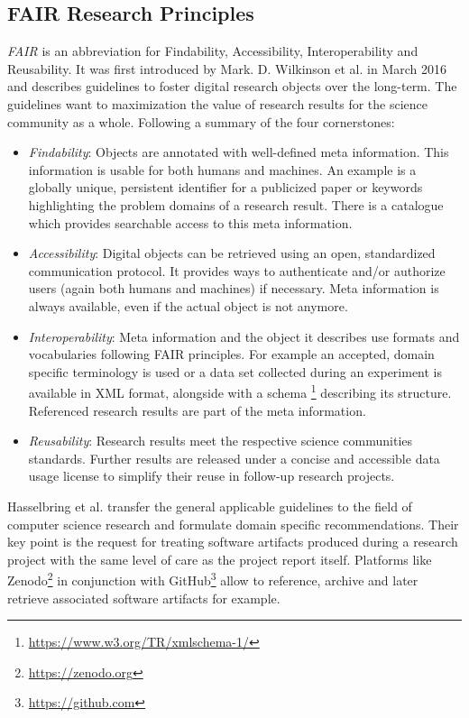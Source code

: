 \documentclass[12pt,a4paper]{article}
\begin{document}
\subsection{FAIR Research Principles}
\label{sec:fair}

\emph{FAIR} is an abbreviation for Findability, Accessibility, Interoperability and Reusability. It was first introduced by Mark. D. Wilkinson et al. in March 2016 \cite{wilkinson:2016} and describes guidelines to foster digital research objects over the long-term. The guidelines want to maximization the value of research results for the science community as a whole. Following a summary of the four cornerstones:

\begin{itemize}
	\item \emph{Findability}: Objects are annotated with well-defined meta information. This information is usable for both humans and machines. An example is a globally unique, persistent identifier for a publicized paper or keywords highlighting the problem domains of a research result. There is a catalogue which provides searchable access to this meta information.
	\item \emph{Accessibility}: Digital objects can be retrieved using an open, standardized communication protocol. It provides ways to authenticate and/or authorize users (again both humans and machines) if necessary. Meta information is always available, even if the actual object is not anymore.
	\item \emph{Interoperability}: Meta information and the object it describes use formats and vocabularies following FAIR principles. For example an accepted, domain specific terminology is used or a data set collected during an experiment is available in XML format, alongside with a schema \footnote{\url{https://www.w3.org/TR/xmlschema-1/}} describing its structure. Referenced research results are part of the meta information.
	\item \emph{Reusability}: Research results meet the respective science communities standards. Further results are released under a concise and accessible data usage license to simplify their reuse in follow-up research projects.
\end{itemize}

Hasselbring et al. \cite{2019arXiv190805986H} transfer the general applicable guidelines to the field of computer science research and formulate domain specific recommendations. Their key point is the request for treating software artifacts produced during a research project with the same level of care as the project report itself. Platforms like Zenodo\footnote{\url{https://zenodo.org}} in conjunction with GitHub\footnote{\url{https://github.com}} allow to reference, archive and later retrieve associated software artifacts for example.
\end{document}
